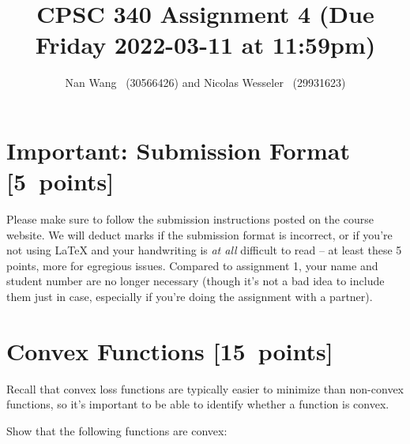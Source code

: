 \documentclass{article}
\newcommand{\blu}[1]{{\textcolor{blu}{#1}}}
\let\ask\blu
\newcommand\pts[1]{\textcolor{pointscolour}{[#1~points]}}
\begin{document}
\title{CPSC 340 Assignment 4 (Due Friday 2022-03-11 at 11:59pm)}
\date{}
\author{Nan Wang \ (30566426) and Nicolas Wesseler \ (29931623)}
\maketitle

\vspace{-4em}


\section*{Important: Submission Format \pts{5}}

    Please make sure to follow the submission instructions posted on the course website.
    \ask{We will deduct marks if the submission format is incorrect, or if you're not using \LaTeX{} and your handwriting is \emph{at all} difficult to read} -- at least these 5 points, more for egregious issues.
    Compared to assignment 1, your name and student number are no longer necessary (though it's not a bad idea to include them just in case, especially if you're doing the assignment with a partner).

\section{Convex Functions \pts{15}}

Recall that convex loss functions are typically easier to minimize than non-convex functions, so it's important to be able to identify whether a function is convex.

\ask{Show that the following functions are convex}:
\end{document}
